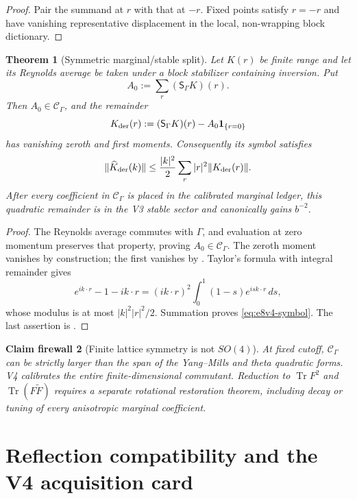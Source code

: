\documentclass[11pt,oneside]{book}
\newtheorem{theorem}{Theorem}[chapter]
\newtheorem{firewall}[theorem]{Claim firewall}
\theoremstyle{definition}
\theoremstyle{remark}
\begin{document}
\begin{proof}
Pair the summand at \(r\) with that at \(-r\).  Fixed points satisfy
\(r=-r\) and have vanishing representative displacement in the
local, non-wrapping block dictionary.
\end{proof}

\begin{theorem}[Symmetric marginal/stable split]
\label{thm:e8v4-quadratic-split}
Let \(K(r)\) be finite range and let its Reynolds average be taken
under a block stabilizer containing inversion.  Put
\[
 A_0:=\sum_r({\mathsf S}_{\Gamma}K)(r).              \label{eq:e8v4-A0}
\]
Then \(A_0\in{\mathcal C}_\Gamma\), and the remainder
\[
 K_{\rm der}(r):=({\mathsf S}_{\Gamma}K)(r)
                 -A_0\mathbf1_{\{r=0\}}             \label{eq:e8v4-Kder}
\]
has vanishing zeroth and first moments.  Consequently its symbol
satisfies
\[
 \|\widehat K_{\rm der}(k)\|
 \leq\frac{|k|^2}{2}\sum_r|r|^2
        \|K_{\rm der}(r)\|.                          \label{eq:e8v4-symbol}
\]
After every coefficient in \({\mathcal C}_\Gamma\) is placed in the
calibrated marginal ledger, this quadratic remainder is in the
V3 stable sector and canonically gains \(b^{-2}\).
\end{theorem}

\begin{proof}
The Reynolds average commutes with \(\Gamma\), and evaluation at zero
momentum preserves that property, proving
\(A_0\in{\mathcal C}_\Gamma\).  The zeroth moment vanishes by
construction; the first vanishes by
.  Taylor's formula with integral
remainder gives
\[
 e^{ik\cdot r}-1-ik\cdot r
 =(ik\cdot r)^2\int_0^1(1-s)e^{isk\cdot r}\,ds,
\]
whose modulus is at most \(|k|^2|r|^2/2\).  Summation proves
\eqref{eq:e8v4-symbol}.  The last assertion is
.
\end{proof}

\begin{firewall}[Finite lattice symmetry is not \(SO(4)\)]
\label{fire:e8v4-commutant}
At fixed cutoff, \({\mathcal C}_\Gamma\) can be strictly larger than
the span of the Yang--Mills and theta quadratic forms.  V4 calibrates
the entire finite-dimensional commutant.  Reduction to
\(\operatorname{Tr}F^2\) and
\(\operatorname{Tr}(F\widetilde F)\) requires a separate rotational
restoration theorem, including decay or tuning of every anisotropic
marginal coefficient.
\end{firewall}

\section{Reflection compatibility and the V4 acquisition card}
\label{sec:e8v4-card}
\end{document}
